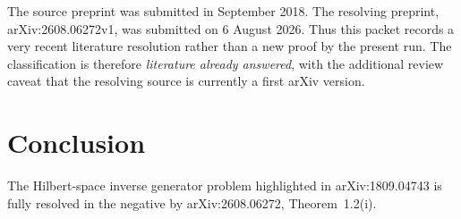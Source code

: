 \documentclass[11pt]{article}
\begin{document}
The source preprint was submitted in September 2018.  The resolving preprint,
arXiv:2608.06272v1, was submitted on 6 August 2026.  Thus this packet records a
very recent literature resolution rather than a new proof by the present run.
The classification is therefore \emph{literature already answered}, with the
additional review caveat that the resolving source is currently a first arXiv
version.

\section*{Conclusion}

The Hilbert-space inverse generator problem highlighted in arXiv:1809.04743 is
fully resolved in the negative by arXiv:2608.06272, Theorem~1.2(i).
\end{document}
